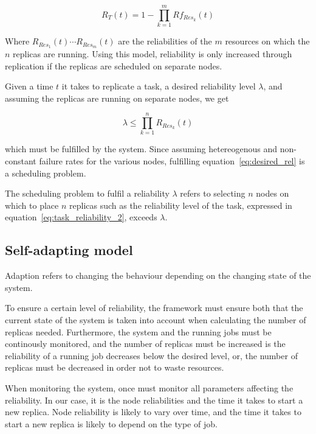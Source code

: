 \documentclass{cslthse-msc}
\begin{document}
\begin{equation} \label{eq:task_reliability_2}
R_{T}(t) = 1 - \prod\limits_{k=1}^m  Rf_{Res_k}(t)
\end{equation}

Where $R_{Res_1}(t) \cdots R_{Res_m}(t)$ are the reliabilities of the $m$ resources on which the $n$ replicas are running. Using this model, reliability is only increased through replication if the replicas are scheduled on separate nodes.

Given a time $t$ it takes to replicate a task, a desired reliability level $\lambda$, and assuming the replicas are running on separate nodes, we get

\begin{equation} \label{eq:desired_rel}
\lambda \leq \prod\limits_{k=1}^n  R_{Res_k}(t)
\end{equation}

which must be fulfilled by the system. Since assuming hetereogenous and non-constant failure rates for the various nodes, fulfilling equation~\ref{eq:desired_rel} is a scheduling problem.

The scheduling problem to fulfil a reliability $\lambda$ refers to selecting $n$ nodes on which to place $n$ replicas such as the reliability level of the task, expressed in equation~\ref{eq:task_reliability_2}, exceeds $\lambda$.

\subsection{Self-adapting model}
Adaption refers to changing the behaviour depending on the changing state of the system. %

To ensure a certain level of reliability, the framework must ensure both that the current state of the system is taken into account when calculating the number of replicas needed. Furthermore, the system and the running jobs must be continously monitored, and the number of replicas must be increased is the reliability of a running job decreases below the desired level, or, the number of replicas must be decreased in order not to waste resources.

When monitoring the system, once must monitor all parameters affecting the reliability. In our case, it is the node reliabilities and the time it takes to start a new replica. Node reliability is likely to vary over time, and the time it takes to start a new replica is likely to depend on the type of job.
\end{document}
